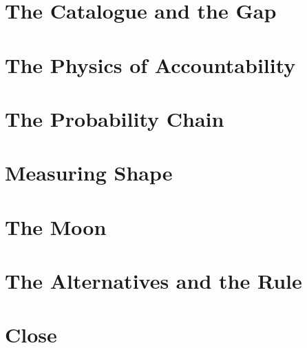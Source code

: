 
\part{The Catalogue and the Gap}
\label{part:catalogue}






\part{The Physics of Accountability}
\label{part:physics}






\part{The Probability Chain}
\label{part:probability}






\part{Measuring Shape}
\label{part:shape}






\part{The Moon}
\label{part:moon}






\part{The Alternatives and the Rule}
\label{part:alternatives}








\part{Close}
\label{part:close}

